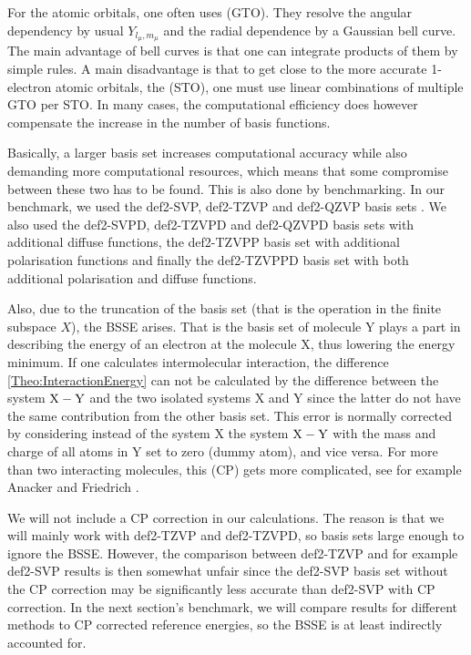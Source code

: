 \documentclass[8.5pt,twoside,twocolumn]{article}
\renewcommand\r{\bo r}
\theoremstyle{standard}
\begin{document}
For the atomic orbitals, one often uses  (GTO). They resolve the
angular dependency by usual  $Y_{l_\mu,m_\mu}$ and the radial dependence
by a Gaussian bell curve. The main advantage of bell curves is that one can integrate products
of them by simple rules. A main disadvantage
is that to get close to the more accurate 1-electron atomic orbitals, the 
(STO), one must use linear combinations of multiple GTO per STO. In many cases, the computational
efficiency does however compensate the increase in the number of basis functions.

Basically, a larger basis set increases computational accuracy while also demanding more
computational resources, which means that some compromise between these two has to
be found. This is also done by benchmarking. In our benchmark, we used the
def2-SVP, def2-TZVP and def2-QZVP basis sets \cite{def2Basis}. We also used the
def2-SVPD, def2-TZVPD and def2-QZVPD basis sets with additional diffuse functions,
the def2-TZVPP basis set with additional polarisation functions and finally the 
def2-TZVPPD basis set with both additional polarisation and diffuse functions.

Also, due to the truncation of the basis set (that is the operation in the finite subspace $X$),
the  BSSE arises. That is the basis set of molecule Y plays a
part in describing the energy of an electron at the molecule X, thus lowering the energy minimum.
If one calculates intermolecular interaction, the difference \eqref{Theo:InteractionEnergy} 
can not be calculated by the difference between the system ${\text X - \text Y}$ and the two isolated systems
X and Y since the latter do not have the same contribution from the other basis set.
This error is normally corrected by considering instead of the system X the system ${\text X - \text Y}$
with the mass and charge of all atoms in Y set to zero (dummy atom), and vice versa.
For more than two interacting molecules, this  (CP) gets
more complicated, see for example Anacker and Friedrich \cite{Anacker2014}.

We will not include a CP correction in our calculations. The reason is that we will mainly
work with def2-TZVP and def2-TZVPD, so basis sets large enough to ignore the 
BSSE. However, the comparison between def2-TZVP and for example def2-SVP results
is then somewhat unfair since the def2-SVP basis set without the CP correction
may be significantly less accurate than def2-SVP with CP correction. In the next
section's benchmark, we will compare results for different methods to CP corrected reference 
energies, so the BSSE is at least indirectly accounted for.
\end{document}

